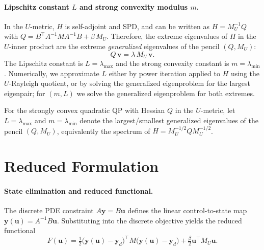 \documentclass[11pt,a4paper]{article}
\begin{document}
\paragraph{Lipschitz constant $L$ and strong convexity modulus $m$.}
In the $U$-metric, $H$ is self-adjoint and SPD, and can be written as $H = M_U^{-1} Q$ with
\(Q = B^\top A^{-1} M A^{-1} B + \beta\, M_U\). Therefore, the extreme eigenvalues of $H$ in the $U$-inner product are the extreme \emph{generalized} eigenvalues of the pencil $(Q,M_U)$:
\begin{equation}
	Q\,\mathbf{v} = \lambda\, M_U\,\mathbf{v}.
\end{equation}
The Lipschitz constant is $L=\lambda_{\max}$ and the strong convexity constant is $m=\lambda_{\min}$. Numerically, we approximate $L$ either by power iteration applied to $H$ using the $U$-Rayleigh quotient, or by solving the generalized eigenproblem for the largest eigenpair; for $(m,L)$ we solve the generalized eigenproblem for both extremes.

For the strongly convex quadratic QP with Hessian $Q$ in the $U$-metric, let
$L=\lambda_{\max}$ and $m=\lambda_{\min}$ denote the largest/smallest generalized eigenvalues of the pencil $(Q, M_U)$,
equivalently the spectrum of $H = M_U^{-1/2} Q M_U^{-1/2}$. 
\fi

\section{Reduced Formulation}

\paragraph{State elimination and reduced functional.}
The discrete PDE constraint $A\mathbf{y}=B\mathbf{u}$ defines the linear control-to-state map
\(\mathbf{y}(\mathbf{u})=A^{-1}B\mathbf{u}\). Substituting into the discrete objective yields the reduced functional
\begin{equation}
  F(\mathbf{u})
  = \tfrac12 \big(\mathbf{y}(\mathbf{u})-\mathbf{y}_d\big)^\top M\big(\mathbf{y}(\mathbf{u})-\mathbf{y}_d\big)
    + \tfrac{\beta}{2} \mathbf{u}^\top M_U\mathbf{u}.
\end{equation}
\end{document}
